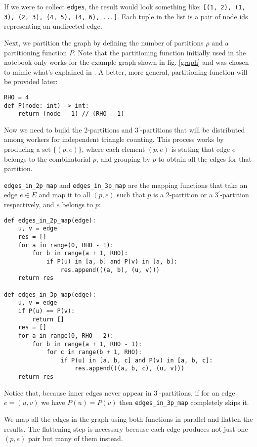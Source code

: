 \documentclass[paper=a4, fontsize=11pt]{scrartcl}
\begin{document}
If we were to collect \texttt{edges}, the result would look
something like: \texttt{[(1, 2), (1, 3), (2, 3), (4, 5), (4, 6),
...]}. Each tuple in the list is a pair of node ids representing an undirected
edge.

Next, we partition the graph by defining the number of partitions $\rho$ and a
partitioning function $P$. Note that the partitioning function initially used in
the notebook only works for the example graph shown in fig. \ref{graph} and was
chosen to mimic what's explained in \cite{park2013efficient}. A better, more
general, partitioning function will be provided later:
\begin{verbatim}
RHO = 4
def P(node: int) -> int:
    return (node - 1) // (RHO - 1)
\end{verbatim}

Now we need to build the 2-partitions and 3$^\prime$-partitions that will be
distributed among workers for independent triangle counting. This process works
by producing a set $\{(p,e)\}$, where each element $(p,e)$ is stating that edge
$e$ belongs to the combinatorial $p$, and grouping by $p$ to obtain all the
edges for that partition.

\texttt{edges_in_2p_map} and \texttt{edges_in_3p_map}
are the mapping functions that take an edge $e\in E$ and map it to all $(p,e)$
such that $p$ is a 2-partition or a 3$^\prime$-partition respectively, and $e$
belongs to $p$:
\begin{verbatim}
def edges_in_2p_map(edge):
    u, v = edge
    res = []
    for a in range(0, RHO - 1):
        for b in range(a + 1, RHO):
            if P(u) in [a, b] and P(v) in [a, b]:
                res.append(((a, b), (u, v)))     
    return res

def edges_in_3p_map(edge):
    u, v = edge
    if P(u) == P(v):
        return []
    res = []
    for a in range(0, RHO - 2):
        for b in range(a + 1, RHO - 1):
            for c in range(b + 1, RHO):
                if P(u) in [a, b, c] and P(v) in [a, b, c]:
                    res.append(((a, b, c), (u, v)))
    return res
\end{verbatim}
Notice that, because inner edges never appear in 3$^\prime$-partitions, if for
an edge $e=(u,v)$ we have $P(u)=P(v)$ then \texttt{edges_in_3p_map}
completely skips it.

We map all the edges in the graph using both functions in parallel and flatten
the results. The flattening step is necessary because each edge produces not
just one $(p,e)$ pair but many of them instead.
\end{document}
